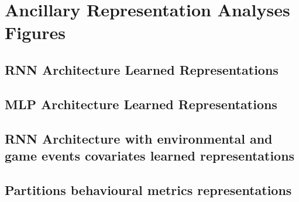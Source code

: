 \chapter{Ancillary Representation Analyses Figures}

\section{RNN Architecture Learned Representations}
\label{rnn_architecture_representations}

\section{MLP Architecture Learned Representations}
\label{mlp_architecture_representations}

\section{RNN Architecture with environmental and game events covariates learned representations}
\label{rnn_env_even_architecture_representations}

\section{Partitions behavioural metrics representations}
\label{partitions_behavioural}

